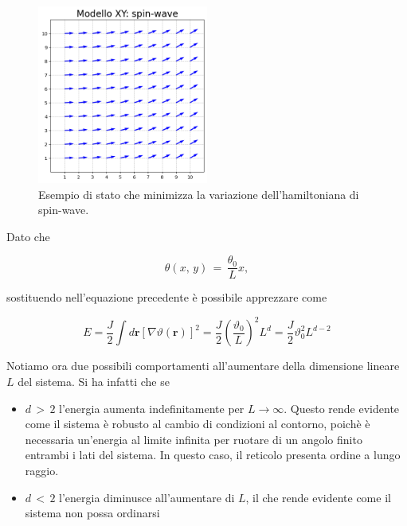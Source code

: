 \begin{figure}[H]
    \centering
    \includegraphics[width=0.5\textwidth]{Immagini/modelloXY_sw.png}
    \caption{Esempio di stato che minimizza la variazione dell'hamiltoniana di spin-wave.}
    \label{fig: modelloXY_sw}
\end{figure}

Dato che 

\begin{equation}
    \theta\left(x,\,y\right)\,=\,\frac{\theta_0}{L}x, 
\end{equation}

sostituendo nell'equazione precedente è possibile apprezzare come 

\begin{equation}
    E = \frac{J}{2} \int d\mathbf{r} \left[ \nabla \vartheta (\mathbf{r}) \right]^2 = \frac{J}{2} \left( \frac{\vartheta_0}{L} \right)^2 L^d = \frac{J}{2} \vartheta_0^2 L^{d-2}
    \label{eq: en_XY_SW}
\end{equation}

Notiamo ora due possibili comportamenti all'aumentare della dimensione lineare $L$ del sistema. Si ha infatti che se 

\begin{itemize}[label=$\diamond$] 
    \item $d\,>\,2$ l'energia aumenta indefinitamente per $L \to \infty$. Questo rende evidente come il sistema è robusto al cambio 
    di condizioni al contorno, poichè è necessaria un'energia al limite infinita per ruotare di un angolo finito entrambi i lati del sistema. 
    In questo caso, il reticolo presenta ordine a lungo raggio.
    \item $d\,<\,2$ l'energia diminusce all'aumentare di $L$, il che rende evidente come il sistema non possa ordinarsi
\end{itemize}

